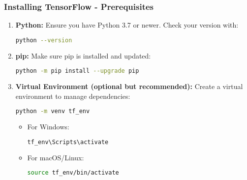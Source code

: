 \documentclass[aspectratio=169]{beamer}
\begin{document}
\begin{frame}[fragile]
    \frametitle{Installing TensorFlow - Prerequisites}
    \begin{enumerate}
        \item \textbf{Python:} Ensure you have Python 3.7 or newer. Check your version with:
        \begin{lstlisting}[language=bash]
            python --version
        \end{lstlisting}
        
        \item \textbf{pip:} Make sure pip is installed and updated:
        \begin{lstlisting}[language=bash]
            python -m pip install --upgrade pip
        \end{lstlisting}
        
        \item \textbf{Virtual Environment (optional but recommended):} Create a virtual environment to manage dependencies:
        \begin{lstlisting}[language=bash]
            python -m venv tf_env
        \end{lstlisting}
        \begin{itemize}
            \item For Windows: 
            \begin{lstlisting}[language=bash]
                tf_env\Scripts\activate
            \end{lstlisting}
            \item For macOS/Linux: 
            \begin{lstlisting}[language=bash]
                source tf_env/bin/activate
            \end{lstlisting}
        \end{itemize}
    \end{enumerate}
\end{frame}
\end{document}
